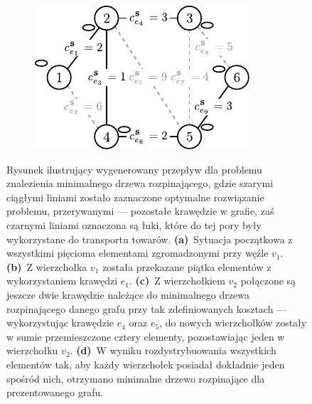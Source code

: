 \begin{figure}[!htbp]
\begin{subfigure}[b]{0.242\textwidth}
		\caption{}
		\label{fig:mst2Example:c}
	\end{subfigure}
	\hfill
	\begin{subfigure}[b]{0.242\textwidth}
		\includegraphics[width=\textwidth]{Chapter_III/MST2-example/d}
		\caption{}
		\label{fig:mst2Example:d}
	\end{subfigure}
	\hfill\null
	\caption{
		Rysunek ilustrujący wygenerowany przepływ dla problemu znalezienia minimalnego drzewa rozpinającego, gdzie szarymi ciągłymi liniami zostało zaznaczone optymalne rozwiązanie problemu, przerywanymi --- pozostałe krawędzie w grafie, zaś czarnymi liniami oznaczona są łuki, które do tej pory były wykorzystane do transportu towarów.
		\textbf{(a)}~Sytuacja początkowa z wszystkimi pięcioma elementami zgromadzonymi przy węźle $v_{1}$.
		\textbf{(b)}~Z wierzchołka $v_{1}$ została przekazane piątka elementów z wykorzystaniem krawędzi $e_{1}$.
		\textbf{(c)}~Z wierzchołkiem $v_{2}$ połączone są jeszcze dwie krawędzie należące do minimalnego drzewa rozpinającego danego grafu przy tak zdefiniowanych kosztach --- wykorzystując krawędzie $e_{4}$ oraz $e_{5}$, do nowych wierzchołków zostały w sumie przemieszczone cztery elementy, pozostawiając jeden w wierzchołku $v_{2}$.
		\textbf{(d)}~W wyniku rozdystrybuowania wszystkich elementów tak, aby każdy wierzchołek posiadał dokładnie jeden spośród nich, otrzymano minimalne drzewo rozpinające dla prezentowanego grafu. 
	}
	\label{fig:mst2Example}
\end{figure}

